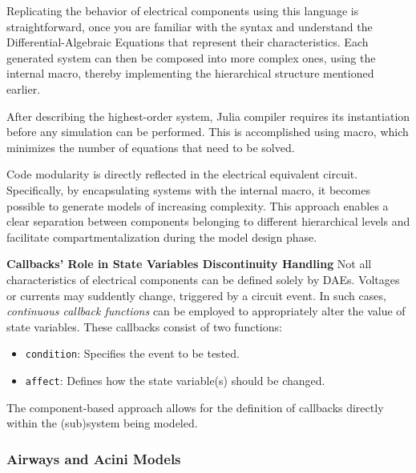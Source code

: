 Replicating the behavior of electrical components using this language
is straightforward, once you are familiar with the syntax and
understand the Differential-Algebraic Equations that represent their
characteristics.  Each generated system can then be composed into more
complex ones, using the internal  macro, thereby
implementing the hierarchical structure mentioned earlier.

After describing the highest-order system, Julia compiler requires its
instantiation before any simulation can be performed.  This is
accomplished using  macro, which minimizes the number
of equations that need to be solved.

Code modularity is directly reflected in the electrical equivalent
circuit.  Specifically, by encapsulating systems with the internal
 macro, it becomes possible to generate models of
increasing complexity.  This approach enables a clear separation
between components belonging to different hierarchical levels and
facilitate compartmentalization during the model design phase.

\vspace{.5em}

{\normalsize\textbf{Callbacks' Role in State Variables
      Discontinuity Handling}} Not all characteristics of electrical
components can be defined solely by DAEs.  Voltages or currents may
suddently change, triggered by a circuit event.  In such cases,
\emph{continuous callback functions} can be employed to appropriately
alter the value of state variables.  These callbacks consist of two
functions:
\begin{itemize}
\item \texttt{condition}: Specifies the event to be tested.
\item \texttt{affect}: Defines how the state variable(s) should be
  changed.
\end{itemize}

The component-based approach allows for the definition of callbacks
directly within the (sub)system being modeled.


\subsubsection{Airways and Acini Models}
\label{subsubsec:blocks_description}



